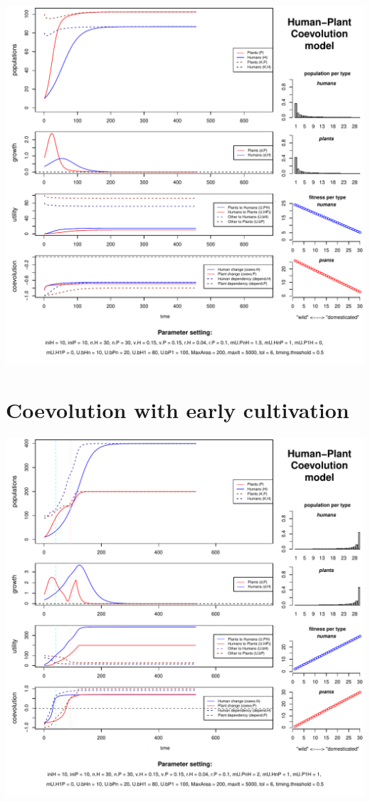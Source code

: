 \documentclass[]{book}
\begin{document}
\includegraphics{hpcModel-exploration_files/figure-latex/1_run.no.coevo-plot-1.pdf}

\newpage

\hypertarget{coevolution-with-early-cultivation}{%
\section{Coevolution with early cultivation}\label{coevolution-with-early-cultivation}}

\includegraphics{hpcModel-exploration_files/figure-latex/1_run.coevo.early.cult-plot-1.pdf}
\end{document}
